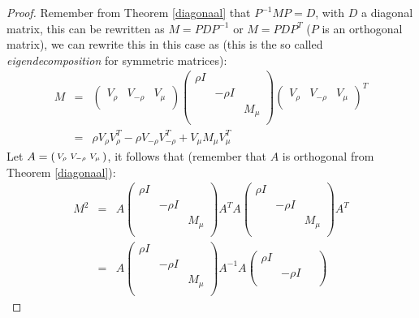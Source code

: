 \documentclass[a4paper,11pt]{report}
\begin{document}
\begin{proof}
Remember from Theorem \ref{diagonaal} that $P^{-1}MP = D$, with $D$ a diagonal 
matrix, this can be rewritten as $M = PDP^{-1}$ or $M = PDP^T$ ($P$ is an orthogonal 
matrix), we can rewrite this in this case as (this is the so called \textit{eigendecomposition} for symmetric matrices):
\begin{eqnarray*}
M &=& \begin{pmatrix} 
V_\rho & V_{-\rho} & V_\mu \\ \end{pmatrix}
\begin{pmatrix}
\rho I & \; & \; \\
\; & -\rho I & \;\\
\; & \; & M_\mu \\
\end{pmatrix}\begin{pmatrix}
V_\rho & V_{-\rho} & V_\mu \\ \end{pmatrix}^T\\
&=&  \rho V_\rho V^T_\rho - \rho V_{-\rho}V^T_{-\rho} + V_{\mu}M_{\mu}V_{\mu}^T
\end{eqnarray*}
Let $A = \begin{psmallmatrix}V_\rho & V_{-\rho} & V_\mu \\\end{psmallmatrix}$, it follows that (remember that $A$ is orthogonal from Theorem \ref{diagonaal}):
\begin{eqnarray*}
  M^2 &=& A\begin{pmatrix}
\rho I & \; & \; \\
\; & -\rho I & \;\\
\; & \; & M_\mu \\
\end{pmatrix}A^TA\begin{pmatrix}
\rho I & \; & \; \\
\; & -\rho I & \;\\
\; & \; & M_\mu \\
\end{pmatrix}A^T\\
&=& A\begin{pmatrix}
\rho I & \; & \; \\
\; & -\rho I & \;\\
\; & \; & M_\mu \\
\end{pmatrix}A^{-1}A\begin{pmatrix}
\rho I & \; & \; \\
\; & -\rho I & \;\\

\end{pmatrix}
\end{eqnarray*}
\end{proof}
\end{document}
